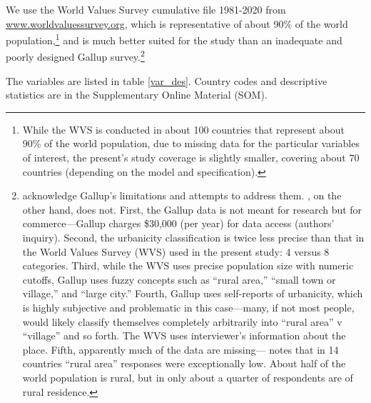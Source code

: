 \documentclass[11pt, letterpaper]{article}
\begin{document}
We use the World Values Survey cumulative file 1981-2020 from \url{www.worldvaluessurvey.org}, which is representative of about 90\% of
the world population,\footnote{While the WVS is conducted in about 100 countries
  that represent about 90\% of the world population, due to missing data for
  the particular variables of interest, the present's study coverage is slightly
smaller, covering about 70 countries (depending on the model and
specification).} and  is much better suited for the study than an inadequate and
poorly designed Gallup survey.\footnote{\citet{easterlin10al} acknowledge Gallup's limitations and attempts
  to address them. \citet{burger20}, on the other hand, does not.
  First, the Gallup
data is not meant for
research but for commerce---Gallup charges \$30,000 (per year) for data access %
  (authors' inquiry). %
%
 Second, the urbanicity classification is twice less precise than that in the World Values Survey (WVS) used in the present study: 4
versus 8 categories. Third, while the WVS uses precise population size with numeric cutoffs,
Gallup uses fuzzy concepts such as ``rural area,'' ``small town or village,'' and ``large city.''
Fourth, %
Gallup uses self-reports of urbanicity, which is highly
subjective and problematic in this case---many, if not most people, would likely
classify themselves completely arbitrarily into ``rural area'' v ``village'' and so forth. The WVS uses interviewer's information about the place. Fifth, apparently much of the data are missing---\citet{easterlin10al} notes that in 14 countries ``rural area'' responses were exceptionally low.
 About half of the world population is rural, but in \citet{burger20} %
 only about a quarter of respondents are of rural residence.
%
}


The variables are listed in table \ref{var_des}. 
Country codes and descriptive statistics are in the Supplementary Online
Material (SOM).  %
\end{document}
